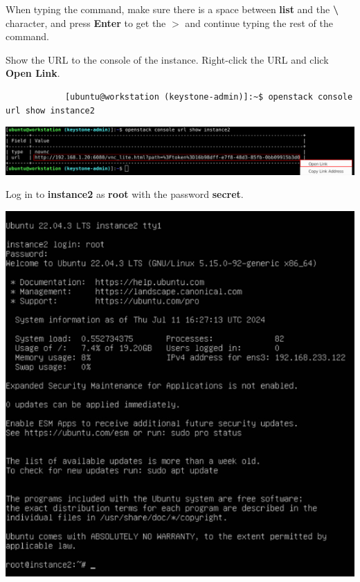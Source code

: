 \documentclass[letterpaper, 12pt]{article}
\begin{document}
\begin{enumerate}
    \begin{tipbox}
        When typing the command, make sure there is a space between \textbf{list} and the \textbf{\textbackslash} character, and press \textbf{Enter} to get the \textbf{$>$} and continue typing the rest of the command.
    \end{tipbox}

    \begin{labstep}
        Show the URL to the console of the instance.
        Right-click the URL and click \textbf{Open Link}.
        \begin{lstlisting}
            [ubuntu@workstation (keystone-admin)]:~$ openstack console url show instance2
        \end{lstlisting}

        \begin{center}
            \includegraphics[width=\linewidth]{images/part2/step5.png}
        \end{center}
    \end{labstep}

    \begin{labstep}
        Log in to \textbf{instance2} as \textbf{root} with the password \textbf{secret}.

        \begin{center}
            \includegraphics[width=\linewidth]{images/part2/step6.png}
        \end{center}
    \end{labstep}


\end{enumerate}
\end{document}
